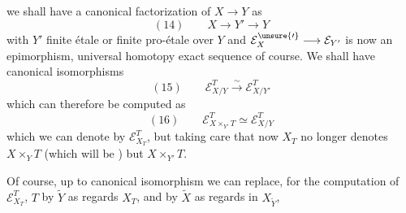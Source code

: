 

we shall have a canonical factorization of $X\longrightarrow Y$ as
\[
(14)\qquad X\longrightarrow Y'\longrightarrow Y
\]
with $Y'$ finite étale or finite pro-étale over $Y$ and $\mathcal E_X^{\unsure{\prime}}\longrightarrow\mathcal E_{Y'}$ is now an epimorphism,   universal homotopy exact sequence of course. We shall have canonical isomorphisms
\[
(15)\qquad \mathcal E_{X/Y}^T\xrightarrow{\sim}\mathcal E_{X/Y'}^T
\]
which can therefore be computed as
\[
(16)\qquad \mathcal E_{X\times_{Y'}T}^T\simeq\mathcal E_{X/Y}^T
\]
which we can denote by $\mathcal E_{X_T}^T$, but taking care that now $X_T$ no longer denotes $X\times_YT$ (which will be  ) but $X\times_{Y'}T$.

Of course, up to canonical isomorphism we can  replace, for the computation of $\mathcal E_{X_T}^T$, $T$ by $\widetilde Y$ as regards $X_T$, and by $\widetilde X$ as regards  in $X_{\widetilde Y}$,

